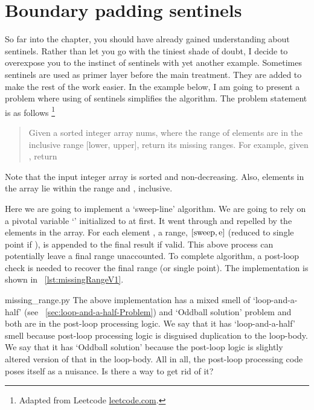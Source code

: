 \section{Boundary padding sentinels}\label{sec:boundaryPaddingSentinels}

So far into the chapter, you should have already gained understanding about sentinels.
Rather than let you go with the tiniest shade of doubt,
I decide to overexpose you to the instinct of sentinels with yet another example.
Sometimes sentinels are used as primer layer before the main treatment.
They are added to make the rest of the work easier.
In the example below, I am going to present a problem where using of sentinels simplifies the
algorithm.
The problem statement is as follows \footnote{Adapted from Leetcode \url{leetcode.com}.}
\begin{quote}
    Given a sorted integer array nums, where the range of elements are
    in the inclusive range [lower, upper], return its missing ranges.
    For example, given \code{[0, 1, 3, 50, 75]}, return \code{[2, (4,49), (51,74), (76,99)]}
\end{quote}
Note that the input integer array is sorted and non-decreasing.
Also, elements in the array lie within the range  and , inclusive.

Here we are going to implement a `sweep-line' algorithm.
We are going to rely on a pivotal variable `' initialized to  at first.
It went through and repelled by the elements in the array.
For each element , a range, $[\code{sweep}, \code{e}]$ (reduced to single point
 if ), is appended to the final result if valid.
This above process can potentially leave a final range unaccounted.
To complete algorithm, a post-loop check is needed to recover the final range (or single point).
The implementation is shown in ~\autoref{lst:missingRangeV1}.

{missing_range.py}
The above implementation has a mixed smell of `loop-and-a-half'
(see ~\autoref{sec:loop-and-a-half-Problem}) and `Oddball solution' problem\@\cite{Fowler1999}
and both are in the post-loop processing logic.
We say that it has `loop-and-a-half' smell because post-loop processing logic is disguised
duplication to the loop-body.
We say that it has `Oddball solution' because the post-loop logic is slightly altered version of
that in the loop-body.
All in all, the post-loop processing code poses itself as a nuisance.
Is there a way to get rid of it?

